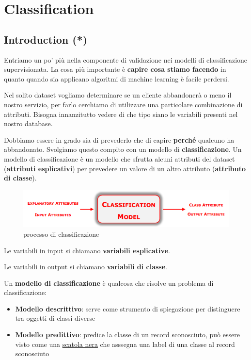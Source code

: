 \section{Classification}

\subsection{Introduction (*)}
Entriamo un po' più nella componente di validazione nei modelli di classificazione supervisionata.
La cosa più importante è \textbf{capire cosa stiamo facendo} in quanto quando sia applicano algoritmi di machine learning è facile perdersi.

Nel solito dataset vogliamo determinare se un cliente abbandonerà o meno il nostro servizio, per farlo cerchiamo di utilizzare una particolare combinazione di attributi. Bisogna innanzitutto vedere di che tipo siano le variabili presenti nel nostro database.

Dobbiamo essere in grado sia di prevederlo che di capire \textbf{perché} qualcuno ha abbandonato. Svolgiamo questo compito con un modello di \textbf{classificazione}. Un modello di classificazione è un modello che sfrutta alcuni attributi del dataset (\textbf{attributi esplicativi}) per prevedere un valore di un altro attributo (\textbf{attributo di classe}).

\begin{figure}[H]
	\hspace{-0.5cm}
	\includegraphics[height=0.2 \linewidth]{classification/pict/class_model.png}
	\caption{processo di classificazione}
\end{figure}

\begin{defn}
	Le variabili in input si chiamano \textbf{variabili esplicative}.
\end{defn}

\begin{defn}
	Le variabili in output si chiamano \textbf{variabili di classe}.
\end{defn}

\begin{defn}
	 Un \textbf{modello di classificazione} è qualcosa che risolve un problema di classificazione:
	\begin{itemize}
		\item \textbf{Modello descrittivo}: serve come strumento di spiegazione per distinguere tra oggetti di classi diverse
		\item \textbf{Modello predittivo}: predice la classe di un record sconosciuto, pu\`o essere visto come una \underline{scatola nera} che asssegna una label di una classe al record sconosciuto
	\end{itemize}
\end{defn}

